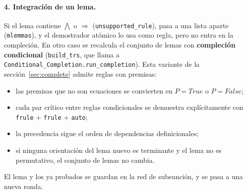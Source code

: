 \documentclass[11pt,a4paper]{article}
\newcommand{\isa}[1]{\texttt{#1}}
\theoremstyle{definition}
\theoremstyle{remark}
\begin{document}
\paragraph{4. Integración de un lema.}
Si el lema contiene $\bigwedge$ o $\Longrightarrow$ (\isa{unsupported\_rule}), pasa a
una lista aparte (\isa{mlemmas}), y el demostrador atómico lo usa como regla, pero no
entra en la compleción. En otro caso se recalcula el conjunto de lemas con
\textbf{compleción condicional} (\isa{build\_trs}, que llama a
\isa{Conditional\_Completion.run\_completion}). Esta variante de la
sección~\ref{sec:complete} admite reglas con premisas:
\begin{itemize}[nosep]
  \item las premisas que no son ecuaciones se convierten en
        $P = \mathit{True}$ o $P = \mathit{False}$;
  \item cada par crítico entre reglas condicionales se demuestra explícitamente con
        \isa{frule} + \isa{frule} + \isa{auto};
  \item la precedencia sigue el orden de dependencias definicionales;
  \item si ninguna orientación del lema nuevo es terminante y el lema no es
        permutativo, el conjunto de lemas no cambia.
\end{itemize}
El lema y los ya probados se guardan en la red de subsunción, y se pasa a una
nueva ronda.
\end{document}
